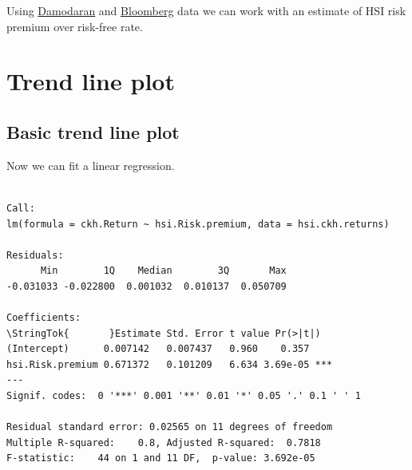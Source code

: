 Using
\href{http://pages.stern.nyu.edu/~adamodar/New_Home_Page/datafile/ctryprem.html}{Damodaran}
and
\href{http://www.bloomberg.com/markets/rates-bonds/government-bonds/us}{Bloomberg}
data we can work with an estimate of HSI risk premium over risk-free
rate.

\begin{Shaded}
\begin{Highlighting}[]
\StringTok{ }\NormalTok{/}
\StringTok{ }\NormalTok{/}
\end{Highlighting}
\end{Shaded}

\section{Trend line plot}\label{trend-line-plot}

\subsection{Basic trend line plot}\label{basic-trend-line-plot}

Now we can fit a linear regression. %

\begin{Shaded}
\begin{Highlighting}[]
\StringTok{ }\StringTok{ } 
\end{Highlighting}
\end{Shaded}

\begin{verbatim}

Call:
lm(formula = ckh.Return ~ hsi.Risk.premium, data = hsi.ckh.returns)

Residuals:
      Min        1Q    Median        3Q       Max 
-0.031033 -0.022800  0.001032  0.010137  0.050709 

Coefficients:
\StringTok{       }Estimate Std. Error t value Pr(>|t|)    
(Intercept)      0.007142   0.007437   0.960    0.357    
hsi.Risk.premium 0.671372   0.101209   6.634 3.69e-05 ***
---
Signif. codes:  0 '***' 0.001 '**' 0.01 '*' 0.05 '.' 0.1 ' ' 1

Residual standard error: 0.02565 on 11 degrees of freedom
Multiple R-squared:    0.8, Adjusted R-squared:  0.7818 
F-statistic:    44 on 1 and 11 DF,  p-value: 3.692e-05
\end{verbatim}

